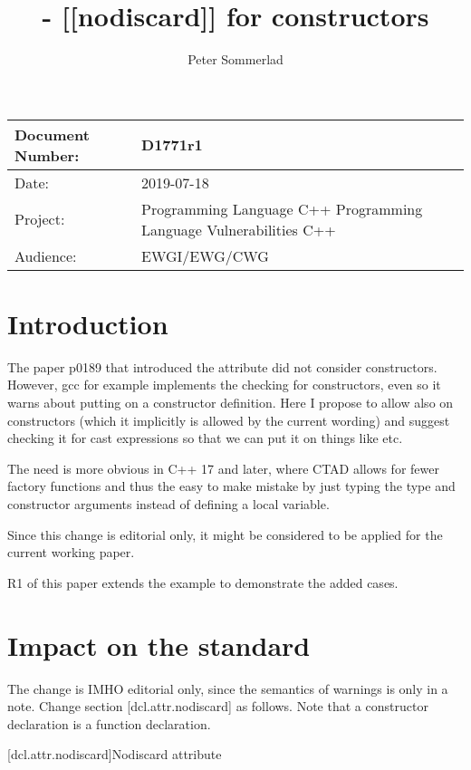 \documentclass[ebook,11pt,article]{memoir}
\title{\papernumber{} - [[nodiscard]] for constructors}
\author{Peter Sommerlad}
\date{\paperdate}                %
\newcommand{\papernumber}{D1771r1}
\newcommand{\paperdate}{2019-07-18}
\begin{document}
\maketitle
\begin{center}
\begin{tabular}[t]{|l|p{8cm}|}\hline 
Document Number:&  \papernumber \\\hline
Date: & \paperdate \\\hline
Project: & Programming Language C++ \newline Programming Language Vulnerabilities C++\\\hline 
Audience: & EWGI/EWG/CWG\\\hline
\end{tabular}
\end{center}


\chapter{Introduction}

The  paper p0189 that introduced the \tcode{[[nodiscard]]} attribute did not consider constructors. However, gcc for example implements the checking for constructors, even so it warns about putting \tcode{[[nodiscard]]} on a constructor definition. Here I propose to allow  \tcode{[[nodiscard]]} also on constructors (which it implicitly is allowed by the current wording) and suggest checking it for cast expressions so that we can put it on things like  etc.

The need is more obvious in C++ 17 and later, where CTAD allows for fewer factory functions and thus the easy to make mistake by just typing the type and constructor arguments instead of defining a local variable.

Since this change is editorial only, it might be considered to be applied for the current working paper.

R1 of this paper extends the example to demonstrate the added cases.

\chapter{Impact on the standard}

The change is IMHO editorial only, since the semantics of warnings is only in a note. Change section [dcl.attr.nodiscard] as follows. Note that a constructor declaration is a function declaration.

[dcl.attr.nodiscard]{Nodiscard attribute}%
\end{document}
